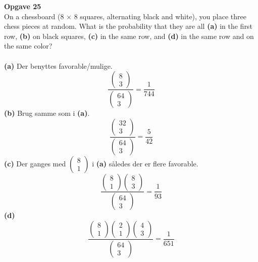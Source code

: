 \documentclass[12pt,a4paper,draft]{report}
\author{Frederik Appel Vardinghus-Nielsen}
\begin{document}
\noindent\textbf{Opgave 25}\\
On a chessboard (8 $\times$ 8 squares, alternating black and white), you place three chess pieces at random. What is the probability that they are all \textbf{(a)} in the first row, \textbf{(b)} on black squares, \textbf{(c)} in the same row, and \textbf{(d)} in the same row and on the same color?\\\\
\textbf{(a)} Der benyttes favorable/mulige.
\begin{equation}
\frac{\begin{pmatrix}
8\\
3
\end{pmatrix}}
{\begin{pmatrix}
64\\
3
\end{pmatrix}}=\frac{1}{744}
\end{equation}
\textbf{(b)} Brug samme som i \textbf{(a)}.
\begin{equation}
\frac{\begin{pmatrix}
32\\
3
\end{pmatrix}}
{\begin{pmatrix}
64\\
3
\end{pmatrix}}
=\frac{5}{42}
\end{equation}
\textbf{(c)} Der ganges med $\begin{pmatrix}8\\1\end{pmatrix}$ i \textbf{(a)} således der er flere favorable.
\begin{equation}
\frac{\begin{pmatrix}
8\\1
\end{pmatrix}
\begin{pmatrix}
8\\
3
\end{pmatrix}}
{\begin{pmatrix}
64\\
3
\end{pmatrix}}
=\frac{1}{93}
\end{equation}
\textbf{(d)}
\begin{equation}
\frac{\begin{pmatrix}
8\\1
\end{pmatrix}
\begin{pmatrix}
2\\1
\end{pmatrix}
\begin{pmatrix}
4\\3
\end{pmatrix}}
{\begin{pmatrix}
64\\3
\end{pmatrix}}
=\frac{1}{651}
\end{equation}
\end{document}
